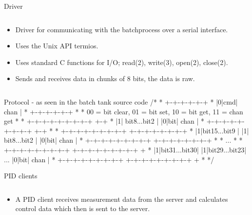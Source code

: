 \documentclass{beamer}
\begin{document}
\begin{frame}{Driver}
\begin{columns}[T]
    \begin{column}{.55\textwidth}
        \begin{itemize}
            \item Driver for communicating with the batchprocess over a serial interface.
            \item Uses the Unix API termios.
            \item Uses standard C functions for I/O; read(2), write(3), open(2), close(2).
            \item Sends and receives data in chunks of 8 bits, the data is raw.   
        \end{itemize}
    \end{column}
    \end{columns}
\end{frame}

\begin {frame}{Protocol - as seen in the batch tank source code}
/*
* +-+-+-+-+-+
* |0|cmd| chan |
* +-+-+-+-+-+
*
* 00 = bit clear, 01 = bit set, 10 = bit get, 11 = chan get
*
* +-+-+-+-+-+-+-+-+ +-+
* |1| bit8...bit2 | |0|bit| chan |
* +-+-+-+-+-+-+-+-+ +-+
*
* +-+-+-+-+-+-+-+-+ +-+-+-+-+-+-+-+
* |1|bit15...bit9 | |1| bit8...bit2 | |0|bit| chan |
* +-+-+-+-+-+-+-+-+ +-+-+-+-+-+-+-+
*
* ...
*
* +-+-+-+-+-+-+-+-+ +-+-+-+-+-+-+-+-+ +
* |1|bit31...bit30| |1|bit29...bit23| ... |0|bit| chan |
* +-+-+-+-+-+-+-+-+ +-+-+-+-+-+-+-+-+ +
*
*/
\end{frame}
\begin{frame}{PID clients}
\begin{columns}[T]
    \begin{column}{.55\textwidth}
        \begin{itemize}
            \item A PID client receives measurement data from the server and calculates control data which then is sent to the server.
            
        \end{itemize}
    \end{column}
    \end{columns}
\end{frame}
\end{document}
